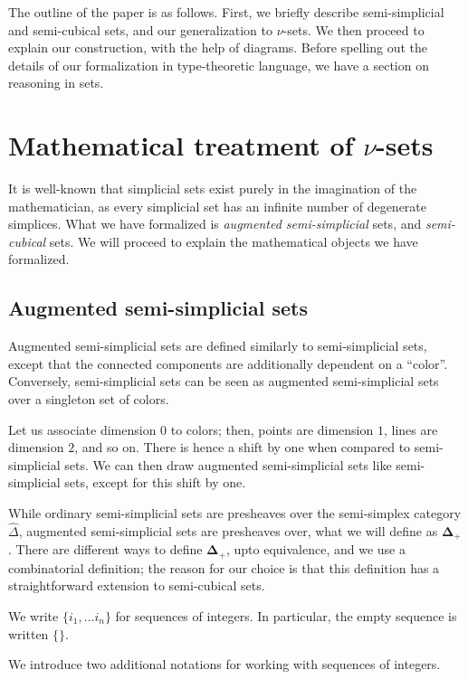 \documentclass[10pt]{art.cls/art}
\newcommand{\DeltaPlus}{\ensuremath{\boldsymbol{\Delta}_+}}
\begin{document}
The outline of the paper is as follows. First, we briefly describe semi-simplicial and semi-cubical sets, and our generalization to $\nu$-sets. We then proceed to explain our construction, with the help of diagrams. Before spelling out the details of our formalization in type-theoretic language, we have a section on reasoning in sets.

\section{Mathematical treatment of \texorpdfstring{$\nu$}{𝜈}-sets}
It is well-known that simplicial sets exist purely in the imagination of the mathematician, as every simplicial set has an infinite number of degenerate simplices. What we have formalized is \emph{augmented semi-simplicial} sets, and \emph{semi-cubical} sets. We will proceed to explain the mathematical objects we have formalized.

\subsection{Augmented semi-simplicial sets}
Augmented semi-simplicial sets are defined similarly to semi-simplicial sets, except that the connected components are additionally dependent on a ``color''. Conversely, semi-simplicial sets can be seen as augmented semi-simplicial sets over a singleton set of colors.

Let us associate dimension $0$ to colors; then, points are dimension $1$, lines are dimension $2$, and so on. There is hence a shift by one when compared to semi-simplicial sets. We can then draw augmented semi-simplicial sets like semi-simplicial sets, except for this shift by one.

While ordinary semi-simplicial sets are presheaves over the semi-simplex category $\hat{\Delta}$, augmented semi-simplicial sets are presheaves over, what we will define as $\DeltaPlus$. There are different ways to define $\DeltaPlus$, upto equivalence, and we use a combinatorial definition; the reason for our choice is that this definition has a straightforward extension to semi-cubical sets.

\begin{notation}
  We write $\{i_1, \ldots i_n\}$ for sequences of integers. In particular, the empty sequence is written $\{\}$.
\end{notation}

We introduce two additional notations for working with sequences of integers.
\end{document}
